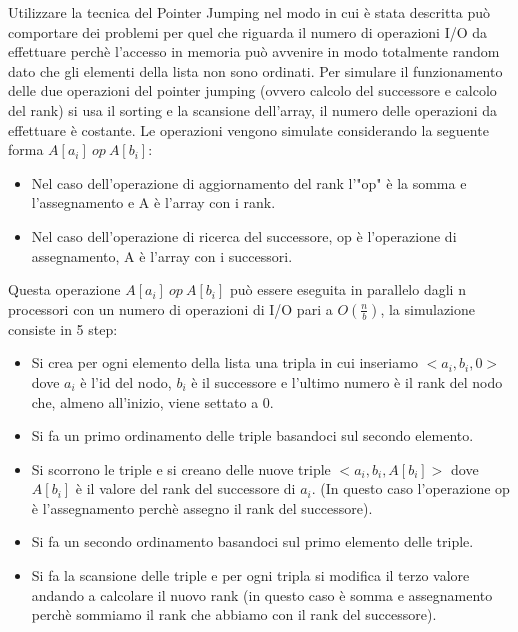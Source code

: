 \documentclass[14pt]{extreport}
\begin{document}
Utilizzare la tecnica del Pointer Jumping nel modo in cui è stata descritta può comportare dei problemi per quel che riguarda il numero di operazioni I/O da effettuare perchè l'accesso in memoria può avvenire in modo totalmente random dato che gli elementi della lista non sono ordinati.
Per simulare il funzionamento delle due operazioni del pointer jumping (ovvero calcolo del successore e calcolo del rank) si usa il sorting e la scansione dell'array, il numero delle operazioni da effettuare è costante.
Le operazioni vengono simulate considerando la seguente forma $A[a_i]\ op\ A[b_i]$:
\begin{itemize}
    \item Nel caso dell'operazione di aggiornamento del rank l'"op" è la somma e l'assegnamento e A è l'array con i rank.
    \item Nel caso dell'operazione di ricerca del successore, op è l'operazione di assegnamento, A è l'array con i successori.
\end{itemize}

Questa operazione $A[a_i]\ op\ A[b_i]$ può essere eseguita in parallelo dagli n processori con un numero di operazioni di I/O pari a $O(\frac{n}{b})$, la simulazione consiste in 5 step:

\begin{itemize}
    \item Si crea per ogni elemento della lista una tripla in cui inseriamo $<a_i, b_i, 0>$ dove $a_i$ è l'id del nodo, $b_i$ è il successore e l'ultimo numero è il rank del nodo che, almeno all'inizio, viene settato a 0.
    \item Si fa un primo ordinamento delle triple basandoci sul secondo elemento.
    \item Si scorrono le triple e si creano delle nuove triple $<a_i, b_i, A[b_i]>$ dove $A[b_i]$ è il valore del rank del successore di $a_i$. (In questo caso l'operazione op è l'assegnamento perchè assegno il rank del successore).
    \item Si fa un secondo ordinamento basandoci sul primo elemento delle triple.
    \item Si fa la scansione delle triple e per ogni tripla si modifica il terzo valore andando a calcolare il nuovo rank (in questo caso è somma e assegnamento perchè sommiamo il rank che abbiamo con il rank del successore).
\end{itemize}
\end{document}
